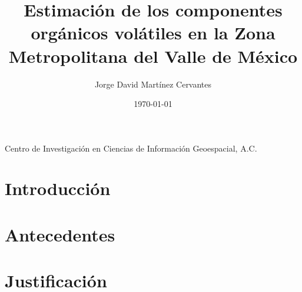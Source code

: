 \documentclass[10pt]{article}
\title{\renewcommand{\baselinestretch}{1.17}\bf%
Estimación de los componentes orgánicos volátiles en la Zona Metropolitana del Valle de México
}
\author{%
Jorge David Martínez Cervantes
}
\begin{document}
\date{\today}

\maketitle

\vspace{-0.5cm}

\begin{center}
{\footnotesize 
Centro de Investigación en Ciencias de Información Geoespacial, A.C. \\
}
\end{center}


\section{Introducción}\label{sec:1}


\section{Antecedentes}\label{sec:2}


\section{Justificación}\label{sec:3}
\end{document}
